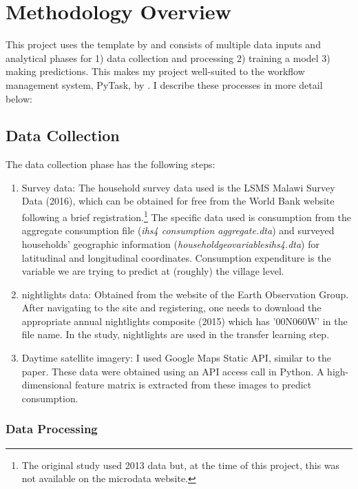 \documentclass[11pt, a4paper, leqno]{article}
\begin{document}
\section{Methodology Overview} 
\noindent This project uses the template by \citet{GaudeckerEconProjectTemplates} and consists of multiple data inputs and analytical phases for 1) data collection and processing 2) training a model 3) making predictions. This makes my project well-suited to the workflow management system, PyTask, by \citet{Raabe2020}. I describe these processes in more detail below:

\subsection{Data Collection}

\noindent The data collection phase has the following steps: \vspace{-0.2cm}
\begin{enumerate}
\item Survey data: The household survey data used is the LSMS Malawi Survey Data (2016), which can be obtained for free from the World Bank website following a brief registration.\footnote{The original study used 2013 data but, at the time of this project, this was not available on the microdata website.} The specific data used is consumption from the aggregate consumption file (\textit{ihs4 consumption aggregate.dta}) and surveyed households' geographic information (\textit{householdgeovariablesihs4.dta}) for latitudinal and longitudinal coordinates. Consumption expenditure is the variable we are trying to predict at (roughly) the village level.
    \item nightlights data: Obtained from the website of the Earth Observation Group. After navigating to the site and registering, one needs to download the appropriate annual nightlights composite (2015) which has '00N060W' in the file name. In the study, nightlights are used in the transfer learning step.
    \item Daytime satellite imagery: I used Google Maps Static API, similar to the paper. These data were obtained using an API access call in Python. A high-dimensional feature matrix is extracted from these images to predict consumption.
\end{enumerate}

\subsubsection{Data Processing}
\end{document}
